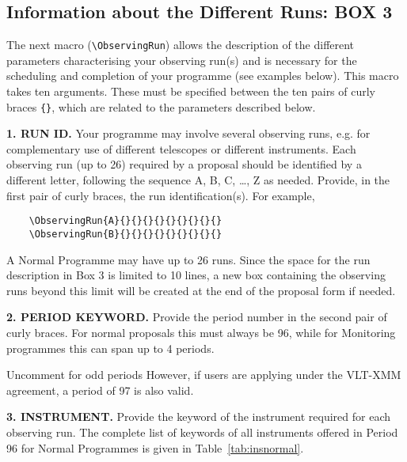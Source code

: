 \documentclass{article}
\begin{document}

\subsection{Information about the Different Runs: {\bf BOX 3}}
\label{sec:obsrun}

The next macro (\verb|\ObservingRun|) allows the description of the
different parameters characterising your observing run(s) and is
necessary for the scheduling and completion of your programme (see
examples below). This macro takes ten arguments.
These must be specified between the ten pairs of curly braces \verb|{}|, 
which are related to the parameters described below.

\medskip

{\bf 1. RUN ID.} Your programme may involve several observing
runs, e.g. for complementary use of different telescopes or
different instruments. Each observing run (up to 26) required by a
proposal should be identified by a different letter, following the
sequence A, B, C, \dots, Z as needed.  Provide, in the first pair of
curly braces, the run identification(s).  For example,
\begin{verbatim}
    \ObservingRun{A}{}{}{}{}{}{}{}{}{}
    \ObservingRun{B}{}{}{}{}{}{}{}{}{}
\end{verbatim}
A Normal Programme may have up to 26 runs. Since the space for the
run description in Box 3 is limited to 10 lines, a new box containing
the observing runs beyond this limit will be created at the end of the
proposal form if needed. 

\medskip

{\bf 2. PERIOD KEYWORD.} Provide the period number in the second pair
of curly braces.  For normal proposals this must always be 96,
while for  Monitoring programmes this can span up to 4 periods.

\ifodd\period
 Uncomment for odd periods
 However, if users are applying under the VLT-XMM agreement,
 a period of 97 is also valid.
\fi

\medskip

{\bf 3. INSTRUMENT.} Provide the keyword of the instrument required
for each observing run. The complete list of keywords of all
instruments offered in Period 96 for Normal Programmes is
given in Table~\ref{tab:insnormal}. 
\end{document}
